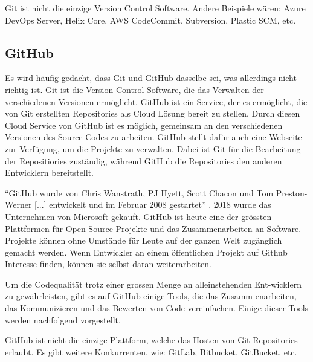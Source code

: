 Git ist nicht die einzige Version Control Software. Andere Beispiele wären:
Azure DevOps Server, Helix Core, AWS CodeCommit, Subversion, Plastic SCM, etc. 
\cite{noauthor_git_nodate-1}

\subsection*{GitHub}
Es wird häufig gedacht, dass Git und GitHub dasselbe sei, was allerdings nicht
richtig ist. Git ist die Version Control Software, die das Verwalten der
verschiedenen Versionen ermöglicht. GitHub ist ein Service, der es ermöglicht,
die von Git erstellten Repositories als Cloud Lösung bereit zu stellen. Durch
diesen Cloud Service von GitHub ist es möglich, gemeinsam an den verschiedenen
Versionen des Source Codes zu arbeiten. GitHub stellt dafür auch eine Webseite
zur Verfügung, um die Projekte zu verwalten. Dabei ist Git für die Bearbeitung
der Repositiories zuständig, während GitHub die Repositories den anderen
Entwicklern bereitstellt.
\cite{noauthor_github_2021} 

``GitHub wurde von Chris Wanstrath, PJ Hyett, Scott Chacon und Tom Preston-Werner
[...] entwickelt und im Februar 2008 gestartet'' \cite{noauthor_github_2021}.
2018 wurde das Unternehmen von Microsoft gekauft. GitHub ist heute eine der
grössten Plattformen für Open Source Projekte und das Zusammenarbeiten an
Software. Projekte können ohne Umstände für Leute auf der ganzen Welt zugänglich
gemacht werden. Wenn Entwickler an einem öffentlichen Projekt auf Github
Interesse finden, können sie selbst daran weiterarbeiten. 
\cite{noauthor_github_2021}

Um die Codequalität trotz einer grossen Menge an alleinstehenden Ent\hyp{}wicklern zu
gewährleisten, gibt es auf GitHub einige Tools, die das Zusamm\hyp{}enarbeiten, das
Kommunizieren und das Bewerten von Code vereinfachen. Einige dieser Tools werden
nachfolgend vorgestellt.

GitHub ist nicht die einzige Plattform, welche das Hosten von Git Repositories
erlaubt. Es gibt weitere Konkurrenten, wie: GitLab, Bitbucket, GitBucket, etc.
\cite{noauthor_top_2021}
